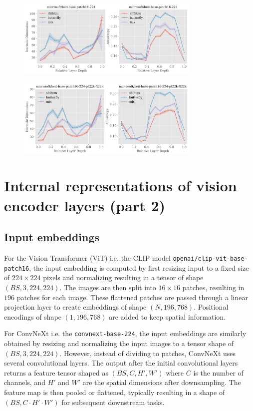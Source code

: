 \documentclass[
  11pt,
  a4paper,
  onecolumn]{article}
\begin{document}
\begin{figure}[h!]
\centering
\includegraphics[width=0.78\textwidth]{figures/microsoft-beit-base-patch16-224_topology.png}
\end{figure}

\begin{figure}[h!]
\centering
\includegraphics[width=0.78\textwidth]{figures/microsoft-beit-base-patch16-224-pt22k-ft22k_topology.png}
\end{figure}


\section{Internal representations of vision encoder layers (part 2)}\label{part_2}

\subsection{Input embeddings}

For the Vision Transformer (ViT) i.e. the CLIP model \texttt{openai/clip-vit-base-patch16}, the input embedding is computed by first resizing input to a fixed size of $224 \times 224$ pixels and normalizing resulting in a tensor of shape $(BS, 3, 224, 224)$. The images are then split into $16 \times 16$ patches, resulting in $196$ patches for each image. These flattened patches are passed through a linear projection layer to create embeddings of shape $(N, 196, 768)$. Positional encodings of shape $(1, 196, 768)$ are added to keep spatial information.

For ConvNeXt i.e. the \texttt{convnext-base-224}, the input embeddings are similarly obtained by resizing and normalizing the input images to a tensor shape of $(BS, 3, 224, 224)$. However, instead of dividing to patches, ConvNeXt uses several convolutional layers. The output after the initial convolutional layers returns a feature tensor shaped as $(BS, C, H', W')$ where $C$ is the number of channels, and $H'$ and $W'$ are the spatial dimensions after downsampling. The feature map is then pooled or flattened, typically resulting in a shape of $(BS, C \cdot H' \cdot W')$ for subsequent downstream tasks.
\end{document}
